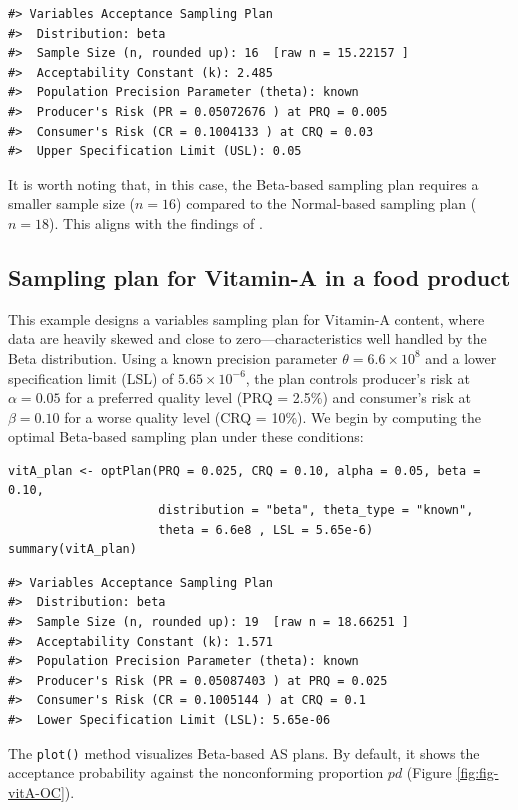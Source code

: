 \begin{verbatim}
#> Variables Acceptance Sampling Plan
#>  Distribution: beta 
#>  Sample Size (n, rounded up): 16  [raw n = 15.22157 ]
#>  Acceptability Constant (k): 2.485 
#>  Population Precision Parameter (theta): known 
#>  Producer's Risk (PR = 0.05072676 ) at PRQ = 0.005 
#>  Consumer's Risk (CR = 0.1004133 ) at CRQ = 0.03 
#>  Upper Specification Limit (USL): 0.05
\end{verbatim}

It is worth noting that, in this case, the Beta-based sampling plan requires a
smaller sample size (\(n = 16\)) compared to the Normal-based sampling plan
(\(n = 18\)). This aligns with the findings of \citet{govindaraju2015sampling}.

\subsection{Sampling plan for Vitamin-A in a food product}\label{subsec:vitA_exp}

This example designs a variables sampling plan for Vitamin-A content, where data
are heavily skewed and close to zero---characteristics well handled by the Beta
distribution. Using a known precision parameter \(\theta = 6.6 \times 10^8\) and
a lower specification limit (LSL) of \(5.65 \times 10^{-6}\), the plan controls
producer's risk at \(\alpha = 0.05\) for a preferred quality level (PRQ = 2.5\%)
and consumer's risk at \(\beta = 0.10\) for a worse quality level (CRQ = 10\%).
We begin by computing the optimal Beta-based sampling plan under these conditions:

\begin{verbatim}
vitA_plan <- optPlan(PRQ = 0.025, CRQ = 0.10, alpha = 0.05, beta = 0.10, 
                     distribution = "beta", theta_type = "known", 
                     theta = 6.6e8 , LSL = 5.65e-6)
summary(vitA_plan)
\end{verbatim}

\begin{verbatim}
#> Variables Acceptance Sampling Plan
#>  Distribution: beta 
#>  Sample Size (n, rounded up): 19  [raw n = 18.66251 ]
#>  Acceptability Constant (k): 1.571 
#>  Population Precision Parameter (theta): known 
#>  Producer's Risk (PR = 0.05087403 ) at PRQ = 0.025 
#>  Consumer's Risk (CR = 0.1005144 ) at CRQ = 0.1 
#>  Lower Specification Limit (LSL): 5.65e-06
\end{verbatim}

The \texttt{plot()} method visualizes Beta-based AS plans. By default, it shows the
acceptance probability against the nonconforming proportion \(pd\) (Figure \ref{fig:fig-vitA-OC}).

